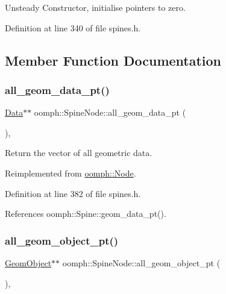 Unsteady Constructor, initialise pointers to zero. 



Definition at line 340 of file spines.\+h.



\subsection{Member Function Documentation}
\mbox{\label{classoomph_1_1SpineNode_a0fbb7845412caffe3908f6d972f9df87}} 
\subsubsection{\texorpdfstring{all\+\_\+geom\+\_\+data\+\_\+pt()}{all\_geom\_data\_pt()}}
{\footnotesize\ttfamily \hyperlink{classoomph_1_1Data}{Data}$\ast$$\ast$ oomph\+::\+Spine\+Node\+::all\+\_\+geom\+\_\+data\+\_\+pt (\begin{DoxyParamCaption}{ }\end{DoxyParamCaption})\hspace{0.3cm}{\ttfamily [inline]}, {\ttfamily [virtual]}}



Return the vector of all geometric data. 



Reimplemented from \hyperlink{classoomph_1_1Node_a76d3081bdc3407744e6d8631a613d780}{oomph\+::\+Node}.



Definition at line 382 of file spines.\+h.



References oomph\+::\+Spine\+::geom\+\_\+data\+\_\+pt().

\mbox{\label{classoomph_1_1SpineNode_a420fcf9b30eea609308298dd54558f92}} 
\subsubsection{\texorpdfstring{all\+\_\+geom\+\_\+object\+\_\+pt()}{all\_geom\_object\_pt()}}
{\footnotesize\ttfamily \hyperlink{classoomph_1_1GeomObject}{Geom\+Object}$\ast$$\ast$ oomph\+::\+Spine\+Node\+::all\+\_\+geom\+\_\+object\+\_\+pt (\begin{DoxyParamCaption}{ }\end{DoxyParamCaption})\hspace{0.3cm}{\ttfamily [inline]}, {\ttfamily [virtual]}}



